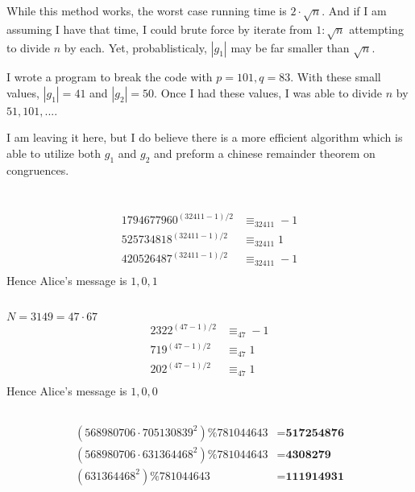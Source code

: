 \documentclass{article}
\begin{document}
While this method works, the worst case running time is $2\cdot \sqrt{n}$. And if I am assuming I have that time, I could brute force by iterate from $1:\sqrt{n}$ attempting to divide $n$ by each. Yet, probablisticaly, $|g_{1}|$ may be far smaller than $\sqrt{n}$.

I wrote a program to break the code with $p = 101, q = 83$. With these small values, $|g_{1}| = 41$ and $|g_{2}| = 50$. Once I had these values, I was able to divide $n$ by $51, 101, ...$.

I am leaving it here, but I do believe there is a more efficient algorithm which is able to utilize both $g_{1}$ and $g_{2}$ and preform a chinese remainder theorem on congruences. 


\newpage
\section{}
\subsection{}
\[
\begin{split}
1794677960^{(32411 - 1)/2} &\equiv_{32411} -1 \\
525734818^{(32411 - 1)/2} &\equiv_{32411} 1 \\
420526487^{(32411 - 1)/2} &\equiv_{32411} -1 \\
\end{split}
\]
Hence Alice's message is $1,0,1$
\subsection{}
$N = 3149 = 47 \cdot 67$
\[
\begin{split}
2322^{(47 - 1)/2} &\equiv_{47} -1\\
719^{(47 - 1)/2} &\equiv_{47} 1\\
202^{(47 - 1)/2} &\equiv_{47} 1\\
\end{split}
\]
Hence Alice's message is $1,0,0$
\subsection{}
\[
\begin{split}
(568980706 \cdot 705130839^{2}) \% 781044643 &= \textbf{517254876} \\
(568980706 \cdot 631364468^{2}) \% 781044643 &= \textbf{4308279} \\
(631364468^{2}) \% 781044643 &= \textbf{111914931} \\
\end{split}
\]
\end{document}
